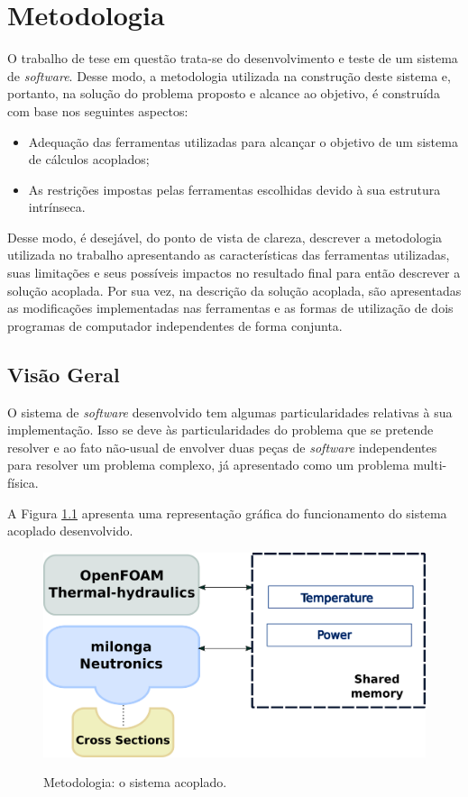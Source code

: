 \chapter{Metodologia}
\label{chap:metodologia}

O trabalho de tese em questão trata-se do desenvolvimento e teste
de um sistema de \textit{software}. Desse modo, a metodologia utilizada na construção
deste sistema e, portanto, na solução do problema proposto e alcance ao objetivo,
é construída com base nos seguintes aspectos:

\begin{itemize}
\item Adequação das ferramentas utilizadas para alcançar o objetivo de um sistema de cálculos acoplados;
\item As restrições impostas pelas ferramentas escolhidas devido à sua estrutura intrínseca.
\end{itemize}

Desse modo, é desejável, do ponto de vista de clareza, descrever a metodologia utilizada no trabalho
apresentando as características das ferramentas utilizadas, suas limitações e seus possíveis impactos
no resultado final para então descrever a solução acoplada. Por sua vez, na descrição da solução
acoplada, são apresentadas as modificações implementadas nas ferramentas e as formas de utilização
de dois programas de computador independentes de forma conjunta.


\section{Visão Geral}

O sistema de \textit{software} desenvolvido tem algumas particularidades relativas à sua
implementação. Isso se deve às particularidades do problema que se pretende resolver e ao
fato não-usual de envolver duas peças de \textit{software} independentes para resolver
um problema complexo, já apresentado como um problema multi-física.

A Figura \ref{metodoetapas} apresenta uma representação gráfica do funcionamento do sistema
acoplado desenvolvido.

\begin{figure}[htb]
  \caption{Metodologia: o sistema acoplado.}
  \centering\includegraphics[scale=0.7]{figuras/metodologia1_wims.png}
  \label{metodoetapas}
\end{figure}

